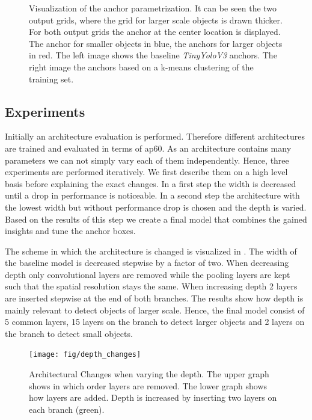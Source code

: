 \begin{figure}[hbtp]
\begin{minipage}{0.3\textwidth}
		\end{minipage}
		\caption{ Visualization of the anchor parametrization. It can be seen the two output grids, where the grid for larger scale objects is drawn thicker. For both output grids the anchor at the center location is displayed. The anchor for smaller objects in blue, the anchors for larger objects in red. The left image shows the baseline \textit{TinyYoloV3} anchors. The right image the anchors based on a k-means clustering of the training set. }
		\label{fig:anchors}
	\end{figure}
	
	\subsection{Experiments}
	
	Initially an architecture evaluation is performed. Therefore different architectures are trained and evaluated in terms of \ac{ap60}. As an architecture contains many parameters we can not simply vary each of them independently. Hence, three experiments are performed iteratively. We first describe them on a high level basis before explaining the exact changes. In a first step the width is decreased until a drop in performance is noticeable. In a second step the architecture with the lowest width but without performance drop is chosen and the depth is varied. Based on the results of this step we create a final model that combines the gained insights and tune the anchor boxes.
	
	The scheme in which the architecture is changed is visualized in . The width of the baseline model is decreased stepwise by a factor of two. When decreasing depth only convolutional layers are removed while the pooling layers are kept such that the spatial resolution stays the same. When increasing depth 2 layers are inserted stepwise at the end of both branches. The results show how depth is mainly relevant to detect objects of larger scale. Hence, the final model consist of 5 common layers, 15 layers on the branch to detect larger objects and 2 layers on the branch to detect small objects.
	
	
		\begin{figure}[hbtp]
			\centering
			\texttt{[image: fig/depth\_changes]}
			\caption{Architectural Changes when varying the depth. The upper graph shows in which order layers are removed. The lower graph shows how layers are added. Depth is increased by inserting two layers on each branch (green). }
			\label{fig:depth_changes}
		\end{figure}
	
